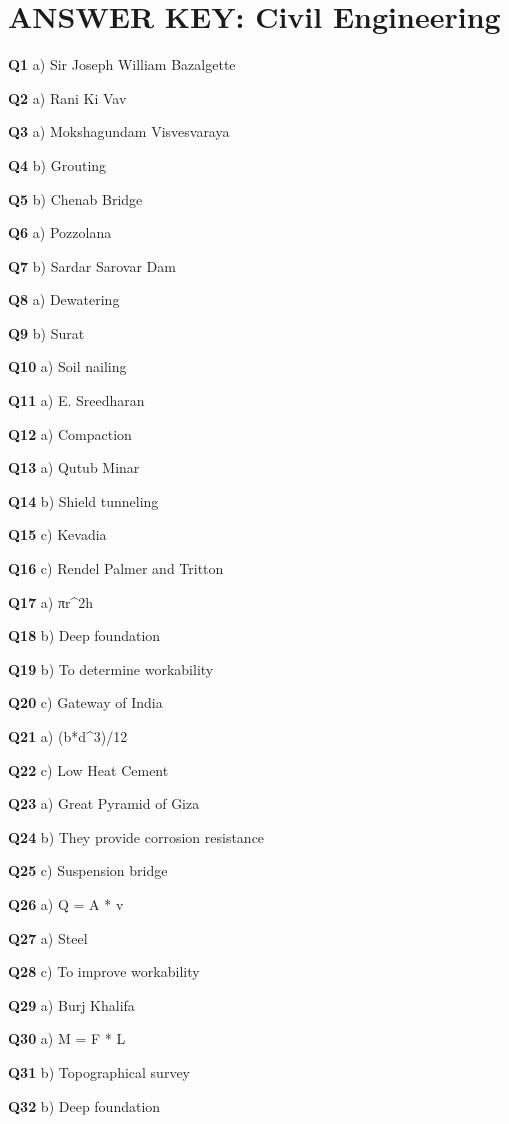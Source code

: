 \section{ANSWER KEY: Civil Engineering}

\textbf{Q1} a) Sir Joseph William Bazalgette\par
\textbf{Q2} a) Rani Ki Vav\par
\textbf{Q3} a) Mokshagundam Visvesvaraya\par
\textbf{Q4} b) Grouting\par
\textbf{Q5} b) Chenab Bridge\par
\textbf{Q6} a) Pozzolana\par
\textbf{Q7} b) Sardar Sarovar Dam\par
\textbf{Q8} a) Dewatering\par
\textbf{Q9} b) Surat\par
\textbf{Q10} a) Soil nailing\par
\textbf{Q11} a) E. Sreedharan\par
\textbf{Q12} a) Compaction\par
\textbf{Q13} a) Qutub Minar\par
\textbf{Q14} b) Shield tunneling\par
\textbf{Q15} c) Kevadia\par
\textbf{Q16} c) Rendel Palmer and Tritton\par
\textbf{Q17} a) πr^2h\par
\textbf{Q18} b) Deep foundation\par
\textbf{Q19} b) To determine workability\par
\textbf{Q20} c) Gateway of India\par
\textbf{Q21} a) (b*d^3)/12\par
\textbf{Q22} c) Low Heat Cement\par
\textbf{Q23} a) Great Pyramid of Giza\par
\textbf{Q24} b) They provide corrosion resistance\par
\textbf{Q25} c) Suspension bridge\par
\textbf{Q26} a) Q = A * v\par
\textbf{Q27} a) Steel\par
\textbf{Q28} c) To improve workability\par
\textbf{Q29} a) Burj Khalifa\par
\textbf{Q30} a) M = F * L\par
\textbf{Q31} b) Topographical survey\par
\textbf{Q32} b) Deep foundation\par
